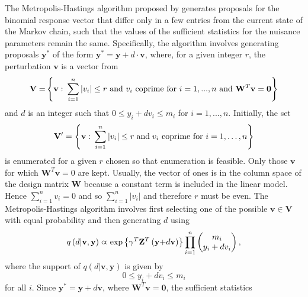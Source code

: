\documentclass[article, shortnames]{jss}
\begin{document}
The Metropolis-Hastings algorithm proposed by \citet{Forster:2003}
generates proposals
for the binomial response vector that differ only in a few entries
from the current state of the
Markov chain, such that the values of the sufficient statistics for
the nuisance parameters remain the same.
Specifically, the algorithm
involves generating proposals $\mathbf{y}^{\ast }$ of the form
$\mathbf{y}^{\ast }=\mathbf{y} +d\cdot \mathbf{v}$,
where, for a given integer $r$, the perturbation $\mathbf{v}$ is a vector from
$$
\mathbf{V=}\left\{ \mathbf{v:}\text{ }\sum_{i=1}^{n}\left\vert
v_{i}\right\vert \leq r\text{ \textrm{and }}v_{i}\text{
\textrm{coprime for} }i=1,...,n\text{ and
}\mathbf{W}^{T}\mathbf{v=0}\right\}
$$
and $d$ is an integer such that $0\leq y_{i}+dv_{i}\leq m_{i}$
for $i=1,...,n$.
Initially, the set
$$
\mathbf{V}'=\left\{ \mathbf{v:} \; \sum_{i=1}^{n} |v_{i}|
\leq r \; {\rm and} \; v_{i}
\mbox{ coprime for } i=1,\ldots ,n
\right\}
$$
is enumerated for a given $r$ chosen so that enumeration is feasible.
Only those $\mathbf{v}$ for which $\mathbf{W}^T \mathbf{v} = 0$ are kept.
Usually, the vector of ones is in the column space of the design
matrix $\mathbf{W}$ because a constant term is included in the linear
model. Hence $\sum\limits_{i=1}^{n}v_{i}=0$ and so
$\sum\limits_{i=1}^{n}\left\vert v_{i}\right\vert$
and therefore $r$ must be even.
The Metropolis-Hastings algorithm involves first selecting one of the
possible $\mathbf{v}\in \mathbf{V}$ with equal probability and then generating $d$
using
$$
q\left( d|\mathbf{v},\mathbf{y}\right) \varpropto \exp \left\{ \mathbf{%
\gamma }^{T}\mathbf{Z}^{T}\left( \mathbf{y+}d\mathbf{v}\right) \right\}
\prod\limits_{i=1}^{n}%
\begin{pmatrix}
m_{i} \\
y_{i}+dv_{i}%
\end{pmatrix}%
,
$$
where the support of $q\left( d|\mathbf{v},\mathbf{y}\right) $ is given by
\begin{equation}
0\leq y_{i}+dv_{i}\leq m_{i}  \label{constraint on y +dv}
\end{equation}%
for all $i$. Since $\mathbf{y}^{\ast }=\mathbf{y}+d\mathbf{v}$, where
$\mathbf{W}^{T}\mathbf{v}=\mathbf{0}$, the sufficient statistics
\end{document}
